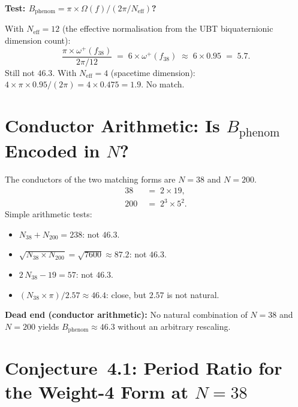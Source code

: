 \documentclass[12pt,a4paper]{article}
\theoremstyle{definition}
\theoremstyle{remark}
\begin{document}
\begin{gapbox}
\textbf{Test: $B_{\mathrm{phenom}} = \pi \times \Omega(f) / (2\pi/N_{\mathrm{eff}})$?}

With $N_{\mathrm{eff}} = 12$ (the effective normalisation from the UBT
biquaternionic dimension count):
\[
  \frac{\pi \times \omega^+(f_{38})}{2\pi/12}
  \;=\; 6 \times \omega^+(f_{38})
  \;\approx\; 6 \times 0.95 \;=\; 5.7 .
\]
Still not $46.3$.  With $N_{\mathrm{eff}} = 4$ (spacetime dimension):
$4 \times \pi \times 0.95 / (2\pi) = 4 \times 0.475 = 1.9$.  No match.
\end{gapbox}

\section{Conductor Arithmetic: Is $B_{\mathrm{phenom}}$ Encoded in $N$?}
\label{sec:conductor}

The conductors of the two matching forms are $N = 38$ and $N = 200$.
\begin{align}
  38 &\;=\; 2 \times 19, \label{eq:N38_factored} \\
  200 &\;=\; 2^3 \times 5^2 . \label{eq:N200_factored}
\end{align}
Simple arithmetic tests:
\begin{itemize}
  \item $N_{38} + N_{200} = 238$: not $46.3$.
  \item $\sqrt{N_{38} \times N_{200}} = \sqrt{7600} \approx 87.2$: not $46.3$.
  \item $2\,N_{38} - 19 = 57$: not $46.3$.
  \item $(N_{38} \times \pi) / 2.57 \approx 46.4$: close, but $2.57$ is not natural.
\end{itemize}

\begin{deadendbox}
\textbf{Dead end (conductor arithmetic):}
No natural combination of $N = 38$ and $N = 200$ yields $B_{\mathrm{phenom}}
\approx 46.3$ without an arbitrary rescaling.
\end{deadendbox}

\section{Conjecture~4.1: Period Ratio for the Weight-4 Form at $N = 38$}
\label{sec:conjecture}
\end{document}
